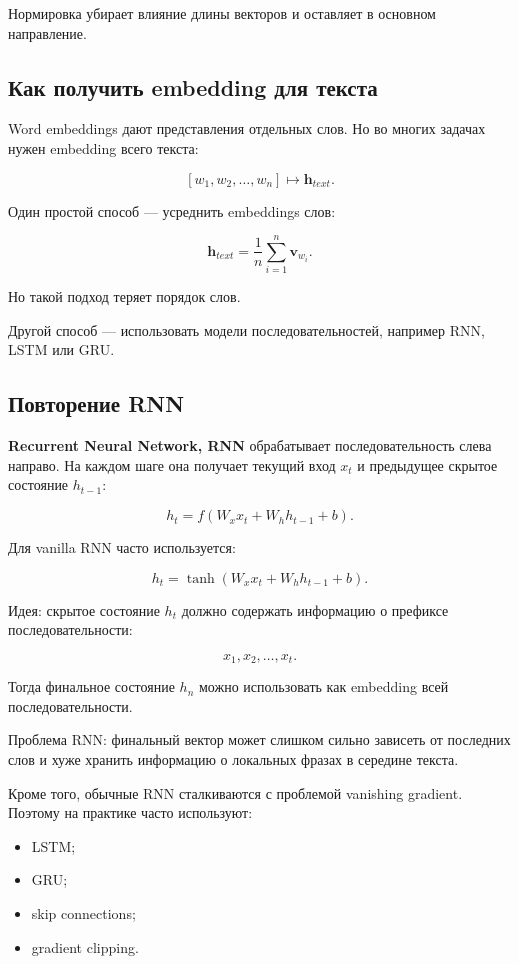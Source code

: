 \documentclass[a4paper,12pt]{article}
\begin{document}
Нормировка убирает влияние длины векторов и оставляет в основном направление.

\subsection{Как получить embedding для текста}

Word embeddings дают представления отдельных слов. Но во многих задачах нужен embedding всего текста:

\[
[w_1, w_2, \dots, w_n]
\mapsto
\bm{h}_{text}.
\]

Один простой способ --- усреднить embeddings слов:

\[
\bm{h}_{text}
=
\frac{1}{n}
\sum_{i=1}^{n}
\bm{v}_{w_i}.
\]

Но такой подход теряет порядок слов.

Другой способ --- использовать модели последовательностей, например RNN, LSTM или GRU.

\subsection{Повторение RNN}

\textbf{Recurrent Neural Network, RNN} обрабатывает последовательность слева направо. На каждом шаге она получает текущий вход \(x_t\) и предыдущее скрытое состояние \(h_{t-1}\):

\[
h_t = f(W_x x_t + W_h h_{t-1} + b).
\]

Для vanilla RNN часто используется:

\[
h_t = \tanh(W_x x_t + W_h h_{t-1} + b).
\]

Идея: скрытое состояние \(h_t\) должно содержать информацию о префиксе последовательности:

\[
x_1, x_2, \dots, x_t.
\]

Тогда финальное состояние \(h_n\) можно использовать как embedding всей последовательности.



Проблема RNN: финальный вектор может слишком сильно зависеть от последних слов и хуже хранить информацию о локальных фразах в середине текста.

Кроме того, обычные RNN сталкиваются с проблемой vanishing gradient. Поэтому на практике часто используют:

\begin{itemize}
    \item LSTM;
    \item GRU;
    \item skip connections;
    \item gradient clipping.
\end{itemize}
\end{document}
